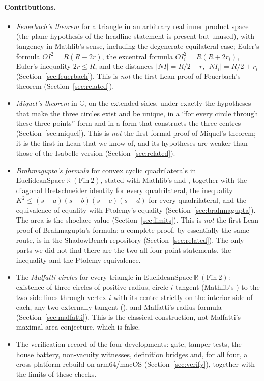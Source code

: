 \documentclass[11pt]{article}
\theoremstyle{definition}
\theoremstyle{remark}
\newcommand{\RR}{\mathbb{R}}
\newcommand{\CC}{\mathbb{C}}
\begin{document}
\paragraph{Contributions.}
\begin{itemize}
\item \emph{Feuerbach's theorem} for a triangle in an arbitrary real inner product space (the
plane hypothesis of the headline statement is present but unused), with tangency in Mathlib's
sense, including the degenerate equilateral case; Euler's formula $OI^2=R(R-2r)$, the excentral
formula $OI_i^2=R(R+2r_i)$, Euler's inequality $2r\le R$, and the distances
$|NI|=R/2-r$, $|NI_i|=R/2+r_i$ (Section~\ref{sec:feuerbach}). This is \emph{not} the first Lean
proof of Feuerbach's theorem (Section~\ref{sec:related}).
\item \emph{Miquel's theorem} in $\CC$, on the extended sides, under exactly the hypotheses that
make the three circles exist and be unique, in a ``for every circle through these three points''
form and in a form that constructs the three centres (Section~\ref{sec:miquel}). This is
\emph{not} the first formal proof of Miquel's theorem; it is the first in Lean that we know of, and
its hypotheses are weaker than those of the Isabelle version (Section~\ref{sec:related}).
\item \emph{Brahmagupta's formula} for convex cyclic quadrilaterals in
$\mathrm{EuclideanSpace}\ \RR\ (\mathrm{Fin}\ 2)$, stated with Mathlib's 
and , together with the diagonal Bretschneider identity for every quadrilateral, the
inequality $K^2\le(s-a)(s-b)(s-c)(s-d)$ for every quadrilateral, and the equivalence of equality
with Ptolemy's equality (Section~\ref{sec:brahmagupta}). The area is the shoelace value
(Section~\ref{sec:limits}). This is \emph{not} the first Lean proof of Brahmagupta's formula: a
complete proof, by essentially the same route, is in the ShadowBench repository
(Section~\ref{sec:related}). The only parts we did not find there are the two all-four-point
statements, the inequality and the Ptolemy equivalence.
\item The \emph{Malfatti circles} for every triangle in $\mathrm{EuclideanSpace}\ \RR\
(\mathrm{Fin}\ 2)$: existence of three circles of positive radius, circle $i$ tangent (Mathlib's
\mdecl{IsTangent}) to the two side lines through vertex $i$ with its centre strictly on the
interior side of each, any two externally tangent (\mdecl{IsExtTangent}), and Malfatti's radius
formula (Section~\ref{sec:malfatti}). This is the classical construction, not Malfatti's
maximal-area conjecture, which is false.
\item The verification record of the four developments: gate, tamper tests, the house battery,
non-vacuity witnesses, definition bridges and, for all four, a cross-platform rebuild on
arm64/macOS (Section~\ref{sec:verify}), together with the limits of these checks.
\end{itemize}
\end{document}
